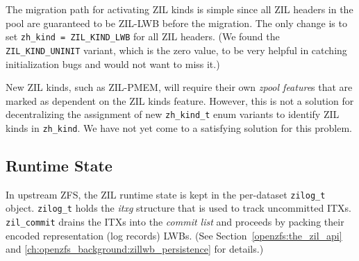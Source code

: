 \documentclass[12pt,a4paper,twoside]{book}
\begin{document}
The migration path for activating ZIL kinds is simple since all ZIL headers in the pool are guaranteed to be ZIL-LWB before the migration.
The only change is to set \lstinline{zh_kind = ZIL_KIND_LWB} for all ZIL headers.
(We found the \lstinline{ZIL_KIND_UNINIT} variant, which is the zero value, to be very helpful in catching initialization bugs and would not want to miss it.)

New ZIL kinds, such as ZIL-PMEM, will require their own \textit{zpool feature}s that are marked as dependent on the ZIL kinds feature.
However, this is not a solution for decentralizing the assignment of new \lstinline{zh_kind_t} enum variants to identify ZIL kinds in \lstinline{zh_kind}.
We have not yet come to a satisfying solution for this problem.

\subsection{Runtime State}\label{sec:zil_kinds:runtime}
In upstream ZFS, the ZIL runtime state is kept in the per-dataset \lstinline{zilog_t} object.
\lstinline{zilog_t} holds the \textit{itxg} structure that is used to track uncommitted ITXs.
\lstinline{zil_commit} drains the ITXs into the \textit{commit list} and proceeds by packing their encoded representation (log records) LWBs.
(See Section~\ref{openzfs:the_zil_api} and \ref{ch:openzfs_background:zillwb_persistence} for details.)
\end{document}
